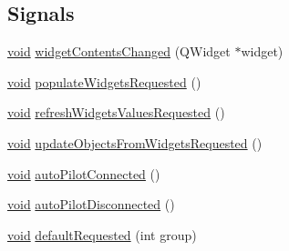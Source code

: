 \subsection*{\-Signals}
\begin{DoxyCompactItemize}
\item 
\hyperlink{group___u_a_v_objects_plugin_ga444cf2ff3f0ecbe028adce838d373f5c}{void} \hyperlink{group___u_a_v_object_widget_utils_gaee198ff7978d5358a93395eb215fa767}{widget\-Contents\-Changed} (\-Q\-Widget $\ast$widget)
\item 
\hyperlink{group___u_a_v_objects_plugin_ga444cf2ff3f0ecbe028adce838d373f5c}{void} \hyperlink{group___u_a_v_object_widget_utils_gacc1be196d23d5e483f68a990d8ebfae6}{populate\-Widgets\-Requested} ()
\item 
\hyperlink{group___u_a_v_objects_plugin_ga444cf2ff3f0ecbe028adce838d373f5c}{void} \hyperlink{group___u_a_v_object_widget_utils_ga6d4f37af17f3990fd37e9eddbb8f3802}{refresh\-Widgets\-Values\-Requested} ()
\item 
\hyperlink{group___u_a_v_objects_plugin_ga444cf2ff3f0ecbe028adce838d373f5c}{void} \hyperlink{group___u_a_v_object_widget_utils_gae43eee3bcf829dcfc91b17c25bc5db95}{update\-Objects\-From\-Widgets\-Requested} ()
\item 
\hyperlink{group___u_a_v_objects_plugin_ga444cf2ff3f0ecbe028adce838d373f5c}{void} \hyperlink{group___u_a_v_object_widget_utils_ga6812138654a8b49e72c674cee7245781}{auto\-Pilot\-Connected} ()
\item 
\hyperlink{group___u_a_v_objects_plugin_ga444cf2ff3f0ecbe028adce838d373f5c}{void} \hyperlink{group___u_a_v_object_widget_utils_gab874b1ad732a19472dc1a9d29f23d7ae}{auto\-Pilot\-Disconnected} ()
\item 
\hyperlink{group___u_a_v_objects_plugin_ga444cf2ff3f0ecbe028adce838d373f5c}{void} \hyperlink{group___u_a_v_object_widget_utils_ga42fb0be146f76a7ce2ef34e655a3015a}{default\-Requested} (int group)
\end{DoxyCompactItemize}
